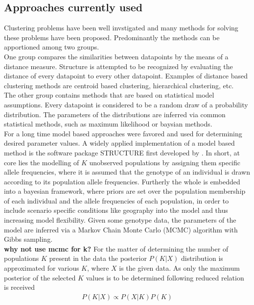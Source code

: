 \documentclass[a4paper, 11pt]{article}
\begin{document}
\subsection{Approaches currently used}
Clustering problems have been well invstigated and many methods for solving these problems have been proposed. Predominantly the methods can be apportioned among two groups.\\
One group compares the similarities between datapoints by the means of a distance measure. Structure is attempted to be recognized by evaluating the distance of every datapoint to every other datapoint. Examples of distance based clustering methods are centroid based clustering, hierarchical clustering, etc.\\
The other group contains methods that are based on statistical model assumptions. Every datapoint is considered to be a random draw of a probability distribution. The parameters of the distributions are inferred via common statistical methods, such as maximum likelihood or baysian methods. \\
For a long time model based approaches were favored and used for determining desired parameter values. A widely applied \parencite{rosenberg2002genetic, harter2004origin, rosenberg2001empirical} implementation of a model based method is the software package STRUCTURE first developed by \parencite{pritchard2000inference, falush2003inference}. In short, at core lies the modelling of $K$ unobserved populations by assigning them specific allele frequencies, where it is assumed that the genotype of an individual is drawn according to its population allele frequencies. Furtherly the whole is embedded into a bayesian framework, where priors are set over the population membership of each individual and the allele frequencies of each population, in order to include scenario specific conditions like geography into the model and thus increasing model flexibility. Given some genotype data, the parameters of the model are inferred via a Markov Chain Monte Carlo (MCMC) algorithm with Gibbs sampling.\\
\textbf{why not use mcmc for k?} For the matter of determining the number of populations $K$ present in the data the posterior $P(K|X)$ distribution is approximated for various $K$, where $X$ is the given data. As only the maximum posterior of the selected $K$ values is to be determined following reduced relation is received
\begin{align*}
P(K|X) \propto P(X|K)P(K) 
\end{align*}
\end{document}
